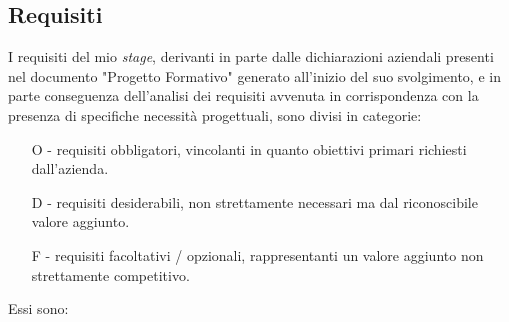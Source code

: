 \subsection{Requisiti}
I requisiti del mio \emph{stage}, derivanti in parte dalle dichiarazioni aziendali presenti nel documento "Progetto Formativo" generato all'inizio del suo svolgimento, e in parte conseguenza dell'analisi dei requisiti avvenuta in corrispondenza con la presenza di specifiche necessità progettuali, sono divisi in categorie:
\begin{enumerate}
	\item[O -]requisiti obbligatori, vincolanti in quanto obiettivi primari richiesti dall'azienda.
    \item[D -]requisiti desiderabili, non strettamente necessari ma dal riconoscibile valore aggiunto.
    \item[F -]requisiti facoltativi / opzionali, rappresentanti un valore aggiunto non strettamente competitivo.\\
\end{enumerate}
Essi sono:

